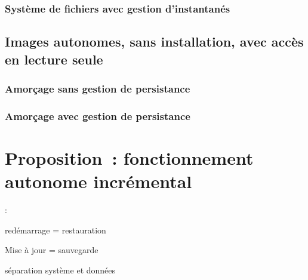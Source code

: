 \ml
{\subsection{\todo}}
{\subsection{Système de fichiers avec gestion d’instantanés}}

\ml
{\section{\todo}}
{\section{Images autonomes, sans installation, avec accès en lecture seule}}

\ml
{\subsection{\todo}}
{\subsection{Amorçage sans gestion de persistance}}

\ml
{\subsection{\todo}}
{\subsection{Amorçage avec gestion de persistance}}

\ml
{\chapter{\todo}}
{\chapter{Proposition : fonctionnement autonome incrémental}}

:
\begin{itmz}
\item{\ml{}
{redémarrage = restauration}}
\item{\ml{}
{Mise à jour = sauvegarde}}
\item{\ml{}
{séparation système et données}}
\end{itmz}

